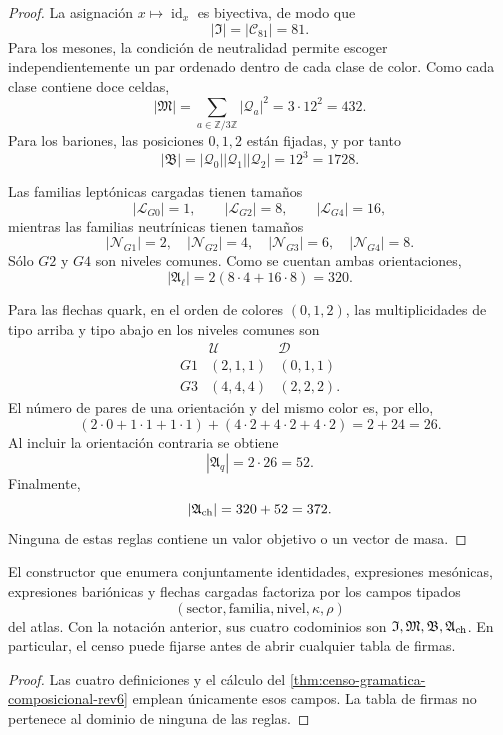 \begin{proof}
La asignación \(x\mapsto\operatorname{id}_x\) es biyectiva, de modo que
\[
 |\mathfrak I|=|\mathcal C_{81}|=81.
\]
Para los mesones, la condición de neutralidad permite escoger
independientemente un par ordenado dentro de cada clase de color. Como cada
clase contiene doce celdas,
\[
 |\mathfrak M|
 =\sum_{a\in\mathbb Z/3\mathbb Z}|\mathcal Q_a|^2
 =3\cdot12^2
 =432.
\]
Para los bariones, las posiciones \(0,1,2\) están fijadas, y por tanto
\[
 |\mathfrak B|
 =|\mathcal Q_0||\mathcal Q_1||\mathcal Q_2|
 =12^3
 =1728.
\]

Las familias leptónicas cargadas tienen tamaños
\[
 |\mathcal L_{G0}|=1,\qquad
 |\mathcal L_{G2}|=8,\qquad
 |\mathcal L_{G4}|=16,
\]
mientras las familias neutrínicas tienen tamaños
\[
 |\mathcal N_{G1}|=2,\quad
 |\mathcal N_{G2}|=4,\quad
 |\mathcal N_{G3}|=6,\quad
 |\mathcal N_{G4}|=8.
\]
Sólo \(G2\) y \(G4\) son niveles comunes. Como se cuentan ambas
orientaciones,
\[
 |\mathfrak A_\ell|
 =2(8\cdot4+16\cdot8)
 =320.
\]

Para las flechas quark, en el orden de colores \((0,1,2)\), las
multiplicidades de tipo arriba y tipo abajo en los niveles comunes son
\[
\begin{array}{ccc}
 &\mathcal U&\mathcal D\\
 G1&(2,1,1)&(0,1,1)\\
 G3&(4,4,4)&(2,2,2).
\end{array}
\]
El número de pares de una orientación y del mismo color es, por ello,
\[
 (2\cdot0+1\cdot1+1\cdot1)
 +(4\cdot2+4\cdot2+4\cdot2)
 =2+24=26.
\]
Al incluir la orientación contraria se obtiene
\[
 |\mathfrak A_q|=2\cdot26=52.
\]
Finalmente,
\[
 |\mathfrak A_{\rm ch}|=320+52=372.
\]
Ninguna de estas reglas contiene un valor objetivo o un vector de masa.
\end{proof}

\begin{corollary}
\label{cor:constructor-composicional-sin-blancos}
El constructor que enumera conjuntamente identidades, expresiones mesónicas,
expresiones bariónicas y flechas cargadas factoriza por los campos tipados
\[
 (\text{sector},\text{familia},\text{nivel},\kappa,\rho)
\]
del atlas. Con la notación anterior, sus cuatro codominios son
\(\mathfrak I,\mathfrak M,\mathfrak B,\mathfrak A_{\rm ch}\).
En particular, el censo puede fijarse antes de abrir cualquier tabla de firmas.
\end{corollary}

\begin{proof}
Las cuatro definiciones y el cálculo del
\cref{thm:censo-gramatica-composicional-rev6} emplean únicamente esos campos.
La tabla de firmas no pertenece al dominio de ninguna de las reglas.
\end{proof}

